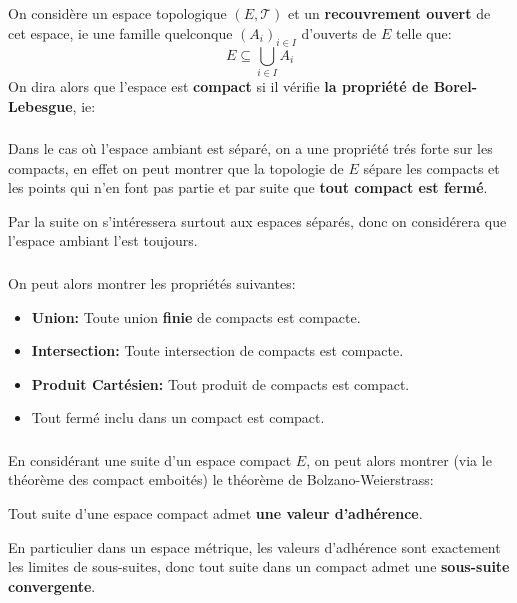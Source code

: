 \chapter*{}
On considère un espace topologique \((E, \mathcal{T})\) et un \textbf{recouvrement ouvert} de cet espace, ie une famille quelconque \((A_i)_{i \in I}\) d'ouverts de \(E\) telle que:
\[
   E \subseteq \bigcup_{i \in I} A_i  
\]
On dira alors que l'espace est \textbf{compact} si il vérifie \textbf{la propriété de Borel-Lebesgue}, ie:
\subsection*{}
Dans le cas où l'espace ambiant est séparé, on a une propriété trés forte sur les compacts, en effet on peut montrer que la topologie de \( E \) sépare les compacts et les points qui n'en font pas partie et par suite que \textbf{tout compact est fermé}.\<

Par la suite on s'intéressera surtout aux espaces séparés, donc on considérera que l'espace ambiant l'est toujours.

\subsection*{}
On peut alors montrer les propriétés suivantes:
\begin{itemize}
   \item \textbf{Union:} Toute union \textbf{finie} de compacts est compacte.
   \item \textbf{Intersection:} Toute intersection de compacts est compacte.
   \item \textbf{Produit Cartésien:} Tout produit de compacts est compact.
   \item Tout fermé inclu dans un compact est compact.
\end{itemize}
\subsection*{}
En considérant une suite d'un espace compact \( E \), on peut alors montrer (via le théorème des compact emboités) le théorème de Bolzano-Weierstrass:
\begin{center}
   Tout suite d'une espace compact admet \textbf{une valeur d'adhérence}.
\end{center}
En particulier dans un espace métrique, les valeurs d'adhérence sont exactement les limites de sous-suites, donc tout suite dans un compact admet une \textbf{sous-suite convergente}.


